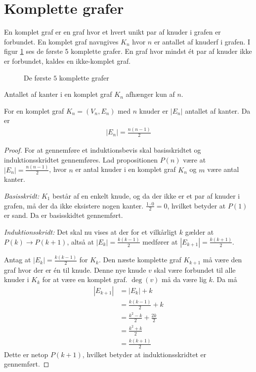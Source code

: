 \section{Komplette grafer}
En komplet graf er en graf hvor et hvert unikt par af knuder i grafen er forbundet.
En komplet graf navngives $K_n$ hvor $n$ er antallet af knuderf i grafen.
I figur \ref{fig:komplette_grafer} ses de første 5 komplette grafer.
En graf hvor mindst ét par af knuder ikke er forbundet, kaldes en ikke-komplet graf.

\begin{figure}[h]
	\centering
	
	\caption{De første $5$ komplette grafer} \label{fig:komplette_grafer}
\end{figure}

Antallet af kanter i en komplet graf $K_n$ afhænger kun af $n$.

\begin{thm}
	For en komplet graf $K_n = (V_n, E_n)$ med $n$ knuder er $|E_n|$ antallet af kanter. Da er
	\begin{align*}
		|E_n| = \frac{n (n - 1)}{2}
	\end{align*}
\end{thm}
\begin{proof}
	For at gennemføre et induktionsbevis skal basisskridtet og induktionsskridtet gennemføres.
	Lad propositionen $P(n)$ være at $|E_n|= \frac{n (n - 1)}{2}$, hvor $n$ er antal knuder i en komplet graf $K_n$ og $m$ være antal kanter.

	\textit{Basisskridt:} $K_1$ består af en enkelt knude, og da der ikke er et par af knuder i grafen, må der da ikke eksistere nogen kanter.
	$\frac{ 1 \cdot 0}{2} = 0$, hvilket betyder at $P(1)$ er sand. Da er basisskidtet gennemført.

	\textit{Induktionsskridt:} Det skal nu vises at der for et vilkårligt $k$ gælder at $P(k) \to P(k + 1)$, altså at $|E_k| = \frac{k (k - 1)}{2}$ medfører at $|E_{k+1}| = \frac{k (k + 1)}{2}$.

	Antag at $|E_k| = \frac{k (k - 1)}{2}$ for $K_k$.
	Den næste komplette graf $K_{k+1}$ må være den graf hvor der er én til knude. Denne nye knude $v$ skal være forbundet til alle knuder i $K_k$ for at være en komplet graf. $\deg (v)$ må da være lig $k$. Da må
	\begin{align*}
		|E_{k+1}| 
		&= |E_k| + k \\
		&= \frac{k (k - 1)}{2} + k \\
		&= \frac{k^2 - k}{2} + \frac{2k}{2} \\
		&= \frac{k^2 + k}{2} \\
		&= \frac{k (k + 1)}{2}
	\end{align*}
	Dette er netop $P(k + 1)$, hvilket betyder at induktionsskridtet er gennemført.
\end{proof}
